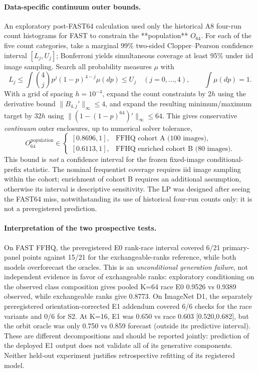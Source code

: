 \paragraph{Data-specific continuum outer bounds.}
An exploratory post-FAST64 calculation used only the historical A8
four-run count histograms for FAST to constrain the **population**
$O_{64}$. For each of the five count categories, take a marginal
99\% two-sided Clopper--Pearson confidence interval
$[L_j,U_j]$; Bonferroni yields simultaneous coverage at least 95\%
under iid image sampling. Search all probability measures $\mu$ with
\[
 L_j\le\int\binom4j p^j(1-p)^{4-j}\mu(dp)\le U_j
 \quad (j=0,\dots,4),\qquad \int\mu(dp)=1.
\]
With a grid of spacing $h=10^{-4}$, expand the count constraints by
$2h$ using the derivative bound $\|B_{4,j}'\|_\infty\le4$, and
expand the resulting minimum/maximum target by $32h$ using
$\|(1-(1-p)^{64})'\|_\infty\le64$. This gives conservative
\emph{continuum} outer enclosures, up to numerical solver tolerance,
\[
 O_{64}^{\mathrm{population}}\in
 \begin{cases}
 [0.8696,1],&\text{FFHQ cohort A (100 images)},\\
 [0.6113,1],&\text{FFHQ enriched cohort B (80 images)}.
 \end{cases}
\]
This bound is \emph{not} a confidence interval for the frozen
fixed-image conditional-prefix statistic. The nominal frequentist
coverage requires iid image sampling within the cohort; enrichment
of cohort B requires an additional assumption, otherwise its
interval is descriptive sensitivity. The LP was designed after
seeing the FAST64 miss, notwithstanding its use of historical
four-run counts only: it is not a preregistered prediction.

\paragraph{Interpretation of the two prospective tests.}
On FAST FFHQ, the preregistered E0 rank-race interval covered 6/21
primary-panel points against 15/21 for the exchangeable-ranks
reference, while both models overforecast the oracles. This is an
\emph{unconditional generation failure}, not independent evidence
in favor of exchangeable ranks: exploratory conditioning on the
observed class composition gives pooled K=64 race E0 0.9526 vs
0.9389 observed, while exchangeable ranks give 0.8773.
On ImageNet D1, the separately preregistered orientation-corrected
E1 addendum covered 6/6 checks for the race variants and 0/6 for
S2. At K=16, E1 was 0.650 vs race 0.603 [0.520,0.682], but the
orbit oracle was only 0.750 vs 0.859 forecast (outside its
predictive interval). These are different decompositions and
should be reported jointly: prediction of the deployed E1 output
does not validate all of its generative components. Neither held-out
experiment justifies retrospective refitting of its registered model.
